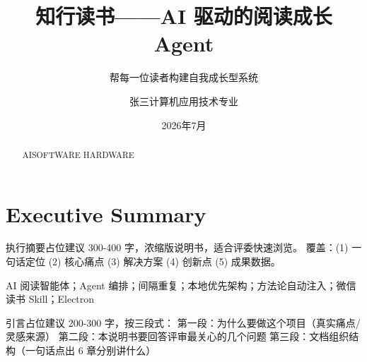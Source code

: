 \documentclass[12pt,a4paper,nomath]{harryopo-report}
\title{知行读书——AI 驱动的阅读成长 Agent}
\subtitle{帮每一位读者构建自我成长型系统}
\author{张三\quad 计算机应用技术专业\quad 2025000101}
\institute{示例大学\quad 计算机学院}
\date{2026年7月}
\begin{document}
\ifshowexecsummary
\section*{Executive Summary}
{执行摘要占位}建议 300-400 字，浓缩版说明书，适合评委快速浏览。
覆盖：(1) 一句话定位 (2) 核心痛点 (3) 解决方案 (4) 创新点 (5) 成果数据。
\fi

\maketitle

\begin{abstract}
\ifx\projectType AISOFTWARE
\abstractAISoftware
\else\ifx\projectType HARDWARE
\abstractHardware
\else
\abstractSocial
\fi\fi
\end{abstract}

\newcommand{\keywords}[1]{%
    \par\vspace{0.6em}%
    #1\par%
    \vspace{0.5em}%
}
\keywords{AI 阅读智能体；Agent 编排；间隔重复；本地优先架构；方法论自动注入；微信读书 Skill；Electron}

\tableofcontents

\introduction
{引言占位}建议 200-300 字，按三段式：
第一段：为什么要做这个项目（真实痛点/灵感来源）
第二段：本说明书要回答评审最关心的几个问题
第三段：文档组织结构（一句话点出 6 章分别讲什么）
\end{document}
